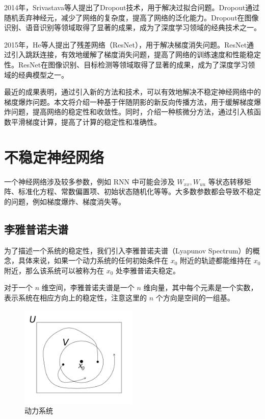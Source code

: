 \documentclass[12pt,a4paper]{amsart}
\begin{document}
2014年，Srivastava等人提出了Dropout技术，用于解决过拟合问题。Dropout通过随机丢弃神经元，减少了网络的复杂度，提高了网络的泛化能力。Dropout在图像识别、语音识别等领域取得了显著的成果，成为了深度学习领域的经典技术之一。

2015年，He等人提出了残差网络（ResNet），用于解决梯度消失问题。ResNet通过引入跳跃连接，有效地缓解了梯度消失问题，提高了网络的训练速度和性能稳定性。ResNet在图像识别、目标检测等领域取得了显著的成果，成为了深度学习领域的经典模型之一。

最近的成果表明，通过引入新的方法和技术，可以有效地解决不稳定神经网络中的梯度爆炸问题。本文将介绍一种基于伴随阴影的新反向传播方法，用于缓解梯度爆炸问题，提高网络的稳定性和收敛性。同时，介绍一种核微分方法，通过引入核函数平滑梯度计算，提高了计算的稳定性和准确性。

\section{不稳定神经网络}

一个神经网络涉及较多参数，例如 RNN 中可能会涉及 $W_{xx}, W_{uu}$ 等状态转移矩阵、标准化方程、常数偏置项、初始状态随机化等等。大多数参数都会导致不稳定的问题，例如梯度爆炸、梯度消失等。

\subsection{李雅普诺夫谱}

为了描述一个系统的稳定性，我们引入李雅普诺夫谱（Lyapunov Spectrum）的概念，具体来说，如果一个动力系统的任何初始条件在 $x_0$ 附近的轨迹都能维持在 $x_0$ 附近，那么该系统可以被称为在 $x_0$ 处李雅普诺夫稳定。

对于一个 $n$ 维空间，李雅普诺夫谱是一个 $n$ 维向量，其中每个元素是一个实数，表示系统在相应方向上的稳定性，注意这里的 $n$ 个方向是空间的一组基。

\begin{figure}[htbp]
    \centering
    \includegraphics[width=0.5\textwidth]{./img/lyapunov_spectrum.jpeg}
    \caption{动力系统}
    \label{fig:lyapunov_spectrum_1}
\end{figure}
\end{document}
